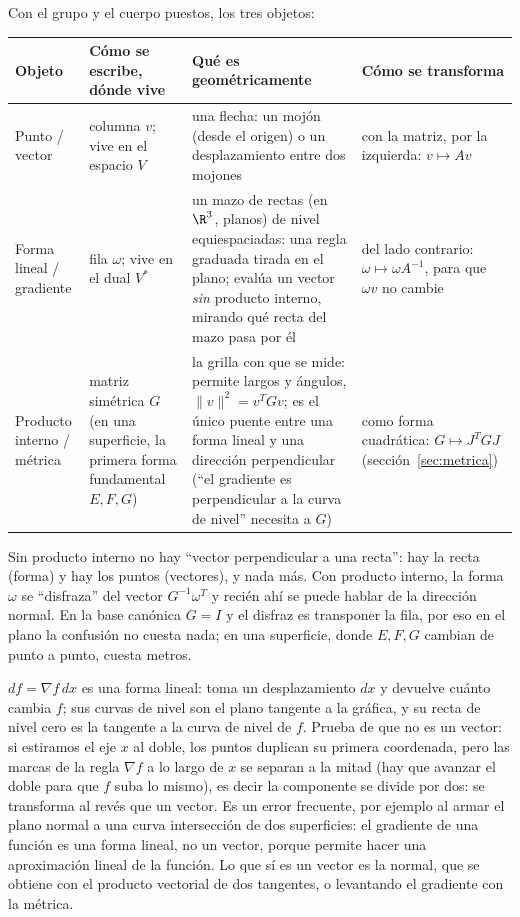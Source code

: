 Con el grupo y el cuerpo puestos, los tres objetos:

{\small
\begin{tabularx}{\textwidth}{>{\bfseries\raggedright\arraybackslash}p{27mm}>{\raggedright\arraybackslash}p{30mm}YY}
\toprule
Objeto & Cómo se escribe, dónde vive & Qué es geométricamente & Cómo se transforma\\
\midrule
Punto / vector & columna \(v\); vive en el espacio \(V\) &
una flecha: un mojón (desde el origen) o un desplazamiento entre dos mojones &
con la matriz, por la izquierda: \(v\mapsto Av\)\\
Forma lineal / gradiente & fila \(\omega\); vive en el dual \(V^{*}\) &
un mazo de rectas (en \(\R^3\), planos) de nivel equiespaciadas: una regla graduada
tirada en el plano; evalúa un vector \emph{sin} producto interno, mirando qué recta del
mazo pasa por él &
del lado contrario: \(\omega\mapsto\omega A^{-1}\), para que \(\omega v\) no cambie\\
Producto interno / métrica & matriz simétrica \(G\) (en una superficie, la primera forma
fundamental \(E,F,G\)) &
la grilla con que se mide: permite largos y ángulos, \(\|v\|^2=v^TGv\); es el único
puente entre una forma lineal y una dirección perpendicular (``el gradiente es
perpendicular a la curva de nivel'' necesita a \(G\)) &
como forma cuadrática: \(G\mapsto J^TGJ\) (sección~\ref{sec:metrica})\\
\bottomrule
\end{tabularx}
}

Sin producto interno no hay ``vector perpendicular a una recta'': hay la recta (forma) y
hay los puntos (vectores), y nada más. Con producto interno, la forma \(\omega\) se
``disfraza'' del vector \(G^{-1}\omega^T\) y recién ahí se puede hablar de la dirección
normal. En la base canónica \(G=I\) y el disfraz es transponer la fila, por eso en el
plano la confusión no cuesta nada; en una superficie, donde \(E,F,G\) cambian de punto a
punto, cuesta metros.

\begin{atencion}
\(df=\nabla f\,dx\) es una forma lineal: toma un desplazamiento \(dx\) y devuelve cuánto
cambia \(f\); sus curvas de nivel son el plano tangente a la gráfica, y su recta de nivel
cero es la tangente a la curva de nivel de \(f\). Prueba de que no es un vector: si
estiramos el eje \(x\) al doble, los puntos duplican su primera coordenada, pero las marcas
de la regla \(\nabla f\) a lo largo de \(x\) se separan a la mitad (hay que avanzar el
doble para que \(f\) suba lo mismo), es decir la componente se divide por dos: se
transforma al revés que un vector. Es un error frecuente, por ejemplo al armar el plano normal a una curva
intersección de dos superficies: el gradiente de una función es una forma lineal, no un
vector, porque permite hacer una aproximación lineal de la función. Lo que sí es un vector es la normal, que se obtiene con el producto
vectorial de dos tangentes, o levantando el gradiente con la métrica.
\end{atencion}

